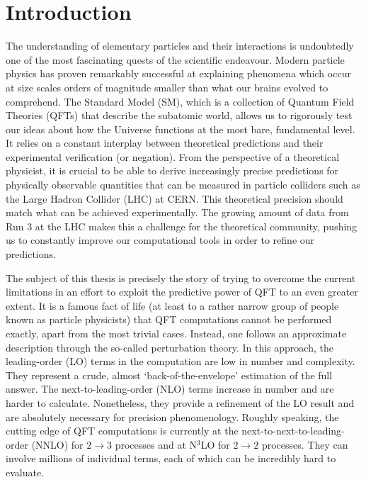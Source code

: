 \documentclass[main.tex]{subfiles}
\begin{document}
\chapter{Introduction} \label{sec:intro}
The understanding of elementary particles and their interactions is undoubtedly one of the most fascinating quests of the scientific endeavour. Modern particle physics has proven remarkably successful at explaining phenomena which occur at size scales orders of magnitude smaller than what our brains evolved to comprehend. The Standard Model (SM), which is a collection of Quantum Field Theories (QFTs) that describe the subatomic world, allows us to rigorously test our ideas about how the Universe functions at the most bare, fundamental level. It relies on a constant interplay between theoretical predictions and their experimental verification (or negation). From the perspective of a theoretical physicist, it is crucial to be able to derive increasingly precise predictions for physically observable quantities that can be measured in particle colliders such as the Large Hadron Collider (LHC) at CERN. This theoretical precision should match what can be achieved experimentally. The growing amount of data from Run 3 at the LHC makes this a challenge for the theoretical community, pushing us to constantly improve our computational tools in order to refine our predictions. 

The subject of this thesis is precisely the story of trying to overcome the current limitations in an effort to exploit the predictive power of QFT to an even greater extent. It is a famous fact of life (at least to a rather narrow group of people known as particle physicists) that QFT computations cannot be performed exactly, apart from the most trivial cases. Instead, one follows an approximate description through the so-called perturbation theory. In this approach, the leading-order (LO) terms in the computation are low in number and complexity. They represent a crude, almost `back-of-the-envelope' estimation of the full answer. The next-to-leading-order (NLO) terms increase in number and are harder to calculate. Nonetheless, they provide a refinement of the LO result and are absolutely necessary for precision phenomenology. Roughly speaking, the cutting edge of QFT computations is currently at the next-to-next-to-leading-order (NNLO) for $2 \rightarrow 3$ processes and at N$^3$LO for $2 \rightarrow 2$ processes. They can involve millions of individual terms, each of which can be incredibly hard to evaluate. 
\end{document}
